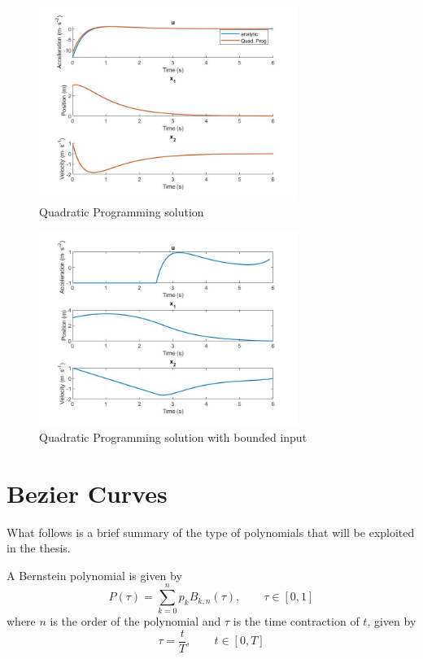 \begin{figure}[h!]
\centering
\includegraphics[width=0.75\textwidth]{Images/quad_prog_unconstrained.jpg}
\caption{Quadratic Programming solution}
\label{fig:solution_quad_prog_un}
\end{figure}


\begin{figure}[h!]
\centering
\includegraphics[width=0.75\textwidth]{Images/quad_prog_constrained.jpg}
\caption{Quadratic Programming solution with bounded input}
\label{fig:solution_quad_prog_con}
\end{figure}




\section{Bezier Curves}
\label{sec:bezcurves}

\par What follows is a brief summary of the type of polynomials that will be exploited in the thesis.

\par A Bernstein polynomial is given by %
\begin{equation}
    \label{eq:bern_pol}
    P(\tau) = \sum_{k=0}^n p_k B_{k,n} (\tau), \qquad \tau\in [0,1]
\end{equation}
where $n$ is the order of the polynomial and $\tau$ is the time contraction of $t$, given by 
\begin{equation}
    \tau = \frac{t}{T}, \qquad t\in [0,T]
    \label{eq:time_delay}
\end{equation}

